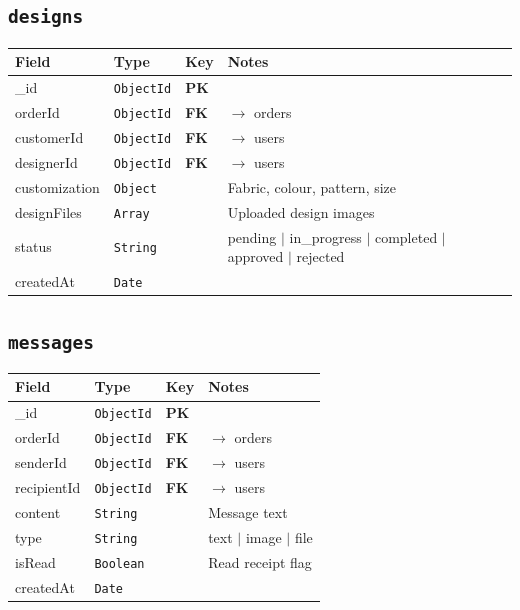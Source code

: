 \documentclass[a4paper,11pt]{article}
\newcommand{\pk}{\textcolor{success}{\textbf{PK}}}
\newcommand{\fk}{\textcolor{warning}{\textbf{FK}}}
\newcommand{\coll}[1]{\textcolor{primary}{\texttt{\textbf{#1}}}}
\newcommand{\dtype}[1]{\textcolor{secondary}{\texttt{#1}}}
\begin{document}
\subsection{\coll{designs}}

\begin{tabular}{@{}L{3.2cm}L{2.8cm}C{1.5cm}L{5.5cm}@{}}
\toprule
{}
\textbf{Field} & \textbf{Type} & \textbf{Key} & \textbf{Notes} \\
\midrule
\_id           & \dtype{ObjectId} & \pk & \\
orderId        & \dtype{ObjectId} & \fk & $\to$ orders \\
customerId     & \dtype{ObjectId} & \fk & $\to$ users \\
designerId     & \dtype{ObjectId} & \fk & $\to$ users \\
customization  & \dtype{Object}   &     & Fabric, colour, pattern, size \\
designFiles    & \dtype{Array}    &     & Uploaded design images \\
status         & \dtype{String}   &     & pending $|$ in\_progress $|$ completed $|$ approved $|$ rejected \\
createdAt      & \dtype{Date}     &     & \\
\bottomrule
\end{tabular}

\subsection{\coll{messages}}

\begin{tabular}{@{}L{3.2cm}L{2.8cm}C{1.5cm}L{5.5cm}@{}}
\toprule
{}
\textbf{Field} & \textbf{Type} & \textbf{Key} & \textbf{Notes} \\
\midrule
\_id         & \dtype{ObjectId} & \pk & \\
orderId      & \dtype{ObjectId} & \fk & $\to$ orders \\
senderId     & \dtype{ObjectId} & \fk & $\to$ users \\
recipientId  & \dtype{ObjectId} & \fk & $\to$ users \\
content      & \dtype{String}   &     & Message text \\
type         & \dtype{String}   &     & text $|$ image $|$ file \\
isRead       & \dtype{Boolean}  &     & Read receipt flag \\
createdAt    & \dtype{Date}     &     & \\
\bottomrule
\end{tabular}
\end{document}
